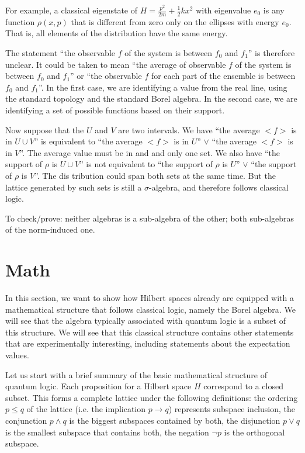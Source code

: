 \documentclass[10pt,twocolumn, nofootinbib]{revtex4-1}
\begin{document}
For example, a classical eigenstate of $H = \frac{p^2}{2m} + \frac{1}{2} k x^2$ with eigenvalue $e_0$ is any function $\rho(x,p)$ that is different from zero only on the ellipses with energy $e_0$. That is, all elements of the distribution have the same energy.

The statement ``the observable $f$ of the system is between $f_0$ and $f_1$'' is therefore unclear. It could be taken to mean ``the average of observable $f$ of the system is between $f_0$ and $f_1$'' or ``the observable $f$ for each part of the ensemble is between $f_0$ and $f_1$''. In the first case, we are identifying a value from the real line, using the standard topology and the standard Borel algebra. In the second case, we are identifying a set of possible functions based on their support.

Now suppose that the $U$ and $V$ are two intervals. We have ``the average $<f>$ is in $U \cup V$'' is  equivalent to ``the average $<f>$ is in $U$'' $\vee$ ``the average $<f>$ is in $V$''. The average value must be in and and only one set. We also have ``the support of $\rho$ is $U \cup V$'' is not equivalent to ``the support of $\rho$ is $U$'' $\vee$ ``the support of $\rho$ is $V$''. The dis tribution could span both sets at the same time. But the lattice generated by such sets is still a $\sigma$-algebra, and therefore follows classical logic.

To check/prove: neither algebras is a sub-algebra of the other; both sub-algebras of the norm-induced one.

\section{Math}

In this section, we want to show how Hilbert spaces already are equipped with a mathematical structure that follows classical logic, namely the Borel algebra. We will see that the algebra typically associated with quantum logic is a subset of this structure. We will see that this classical structure contains other statements that are experimentally interesting, including statements about the expectation values.

Let us start with a brief summary of the basic mathematical structure of quantum logic. Each proposition for a Hilbert space $H$ correspond to a closed subset. This forms a complete lattice under the following definitions: the ordering $p \leq q$ of the lattice (i.e. the implication $p \to q$) represents subspace inclusion, the conjunction $p \wedge q$ is the biggest subspaces contained by both, the disjunction $p \vee q$ is the smallest subspace that contains both, the negation $\neg p$ is the orthogonal subspace.
\end{document}
